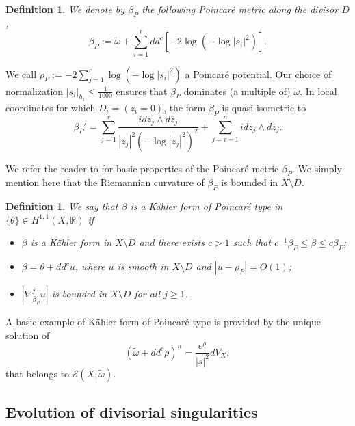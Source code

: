 \documentclass[11pt]{amsart}
\numberwithin{equation}{section}
\newtheorem{defi}[theorem]{Definition}
\newcommand{\R}{\mathbb R}
\newcommand{\f}{\varphi}
\begin{document}
\begin{defi}
 We denote by $\beta_P$ the following Poincaré metric along the divisor $D$,
 $$
 \beta_P:=\tilde{\omega} + \sum_{i=1}^r  dd^c [-2 \log(-\log |s_i|^2)].
 $$
\end{defi}

We call $\rho_P:=-2\sum_{j=1}^r \log(-\log |s_i|^2)$ a Poincar\'e potential.
 Our choice of normalization $|s_i|_{h_i} \leq \frac{1}{1000}$ ensures that 
 $\beta_P$ dominates (a multiple of) $\tilde{\omega}$. In local coordinates
 for which  $D_i=(z_i=0)$, the form $\beta_P$ is quasi-isometric to
 $$
 \beta_P'=\sum_{j=1}^r \frac{id z_j \wedge d\overline{z}_j}{|z_j|^2 (-\log |z_j|^2)^2}
 +\sum_{j=r+1}^n id z_j \wedge d\overline{z}_j.
 $$
 
 
We refer the reader to \cite{Kob84} for basic properties of the Poincaré metric $\beta_P$. 
 We simply mention here that the Riemannian curvature of $\beta_P$ is bounded in $X \setminus D$.
 

 \begin{defi}
  We say that $\beta$ is a K\"ahler form of Poincaré type
 in $\{ {\theta}\} \in H^{1,1}(X,\R)$ if 
 \begin{itemize}
 \item $\beta$ is a K\"ahler form in $X \setminus D$ and there exists $c>1$ such that $c^{-1} \beta_P \leq \beta \leq c \beta_P$;
 \item $\beta=\theta+dd^c u$, where $u$ is smooth in $X\setminus D$ and $|u-\rho_P|=O(1)$;
 \item $\left| \nabla_{\beta_P}^j u \right|$ is bounded in $X \setminus D$ for all $j \geq 1$.
 \end{itemize}
 \end{defi}
 
 A basic example of K\"ahler form of Poincaré type is provided by the unique solution of 
 $$
 (\tilde{\omega}+dd^c \rho)^n=\frac{e^{\rho}}{|s|^2} dV_X,
 $$
 that belongs to $\mathcal{E}(X,\tilde{\omega})$.
  
 
 





\subsection{Evolution of divisorial singularities}
\end{document}
